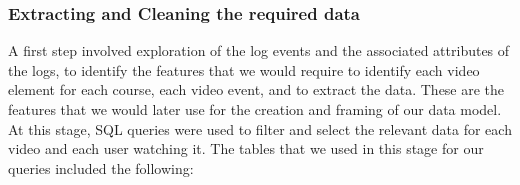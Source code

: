 \documentclass[16pt]{report}
\begin{document}



\subsubsection{Extracting and Cleaning the required data}

A first step involved exploration of the log events and the associated attributes of the logs, to identify the features that we would require to identify each video element for each course, each video event, and to extract the data. These are the features that we would later use for the creation and framing of our data model. At this stage, SQL queries were used to filter and select the relevant data for each video and each user watching it. The tables that we used in this stage for our queries included the following:
\end{document}
